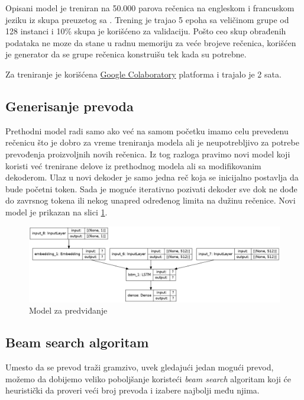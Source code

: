 \documentclass[a4paper]{article}
\begin{document}
Opisani model je treniran na 50.000 parova rečenica na engleskom i francuskom jeziku iz skupa preuzetog sa \cite{manythings}. Trening je trajao 5 epoha sa veličinom grupe od 128 instanci i 10\% skupa je korišćeno za validaciju. Pošto ceo skup obrađenih podataka ne moze da stane u radnu memoriju za veće brojeve rečenica, korišćen je generator da se grupe rečenica konstruišu tek kada su potrebne.

Za treniranje je korišćena \href{https://colab.research.google.com/}{Google Colaboratory} platforma i trajalo je 2 sata.

\subsection{Generisanje prevoda}

Prethodni model radi samo ako već na samom početku imamo celu prevedenu rečenicu što je dobro za vreme treniranja modela ali je neupotrebljivo za potrebe prevođenja proizvoljnih novih rečenica. Iz tog razloga pravimo novi model koji koristi već trenirane delove iz prethodnog modela ali sa modifikovanim dekoderom.
Ulaz u novi dekoder je samo jedna reč koja se inicijalno postavlja da bude početni token. Sada je moguće iterativno pozivati dekoder sve dok ne dođe do zavrsnog tokena ili nekog unapred određenog limita na dužinu rečenice.
Novi model je prikazan na slici \ref{fig:inference_model}.

\begin{figure}[h!]
  \centering
    \includegraphics[width=\textwidth]{inference_model}
  \caption{Model za predviđanje}
  \label{fig:inference_model}
\end{figure}

\subsection{Beam search algoritam}

Umesto da se prevod traži gramzivo, uvek gledajući jedan mogući prevod, možemo da dobijemo veliko poboljšanje koristeći \textit{beam search} algoritam koji će heuristički da proveri veći broj prevoda i izabere najbolji među njima.
\end{document}
